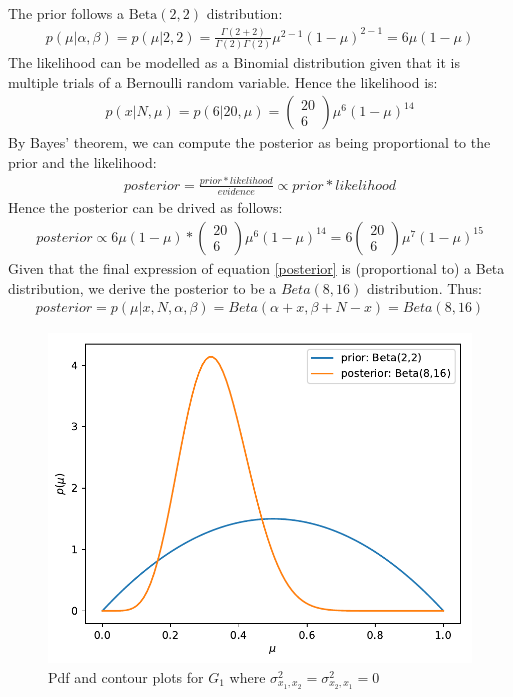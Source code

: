 \documentclass[12pt,twoside]{article}
\begin{document}
The prior follows a $\operatorname{Beta(2,2)}$ distribution:
\begin{align}
    p(\mu|\alpha,\beta) = p(\mu|2,2) =\frac{\Gamma(2+2)}{\Gamma(2)\Gamma(2)}\mu^{2-1}(1-\mu)^{2-1} = 6\mu(1-\mu)
\end{align}
The likelihood can be modelled as a Binomial distribution given that it is multiple trials of a Bernoulli random variable. Hence the likelihood is:
\begin{align}
    p(x|N,\mu) = p(6|20,\mu) = \begin{pmatrix}20 \\6\end{pmatrix}\mu^6(1-\mu)^{14}
\end{align}
By Bayes' theorem, we can compute the posterior as being proportional to the prior and the likelihood:
\begin{align}
    posterior = \frac{prior*likelihood}{evidence} \propto prior*likelihood
\end{align}
Hence the posterior can be drived as follows:
\begin{align}
\label{posterior}
    posterior \propto 6\mu(1-\mu)*\begin{pmatrix}20 \\6\end{pmatrix}\mu^6(1-\mu)^{14} = 6\begin{pmatrix}20 \\6\end{pmatrix}\mu^7(1-\mu)^{15}
\end{align}
Given that the final expression of equation \ref{posterior} is (proportional to) a Beta distribution, we derive the posterior to be a $Beta(8,16)$ distribution. Thus:
\begin{align}
    posterior = p(\mu|x,N,\alpha,\beta) = Beta(\alpha + x, \beta + N - x) = Beta(8,16)
\end{align}

\begin{figure}[h]
\centering %
\includegraphics[width = 0.6\hsize]{./figures/beta_distribs.pdf} %
\caption{Pdf and contour plots  for $G_1$ where $\sigma^2_{x_1,x_2} = \sigma^2_{x_2,x_1} = 0$ } %
\label{B1}
\end{figure}
\end{document}

